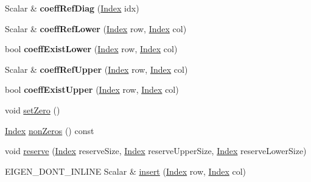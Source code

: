 \begin{DoxyCompactItemize}
Scalar \& {\bfseries coeff\+Ref\+Diag} (\hyperlink{group___core___module_a554f30542cc2316add4b1ea0a492ff02}{Index} idx)
\item 
\mbox{\label{class_eigen_1_1_skyline_matrix_af844129d30a78a6d0ce5d4fac96a0417}} 
Scalar \& {\bfseries coeff\+Ref\+Lower} (\hyperlink{group___core___module_a554f30542cc2316add4b1ea0a492ff02}{Index} row, \hyperlink{group___core___module_a554f30542cc2316add4b1ea0a492ff02}{Index} col)
\item 
\mbox{\label{class_eigen_1_1_skyline_matrix_a30808fc10f3c0e0add1f410013c9937c}} 
bool {\bfseries coeff\+Exist\+Lower} (\hyperlink{group___core___module_a554f30542cc2316add4b1ea0a492ff02}{Index} row, \hyperlink{group___core___module_a554f30542cc2316add4b1ea0a492ff02}{Index} col)
\item 
\mbox{\label{class_eigen_1_1_skyline_matrix_ab7fdd73227a49ea3fde214d36f48dd53}} 
Scalar \& {\bfseries coeff\+Ref\+Upper} (\hyperlink{group___core___module_a554f30542cc2316add4b1ea0a492ff02}{Index} row, \hyperlink{group___core___module_a554f30542cc2316add4b1ea0a492ff02}{Index} col)
\item 
\mbox{\label{class_eigen_1_1_skyline_matrix_aaa87a38402be32756e4d64790c5a9f67}} 
bool {\bfseries coeff\+Exist\+Upper} (\hyperlink{group___core___module_a554f30542cc2316add4b1ea0a492ff02}{Index} row, \hyperlink{group___core___module_a554f30542cc2316add4b1ea0a492ff02}{Index} col)
\item 
void \hyperlink{class_eigen_1_1_skyline_matrix_afeb349e5dc4b5d8c107ff067b44438f5}{set\+Zero} ()
\item 
\hyperlink{group___core___module_a554f30542cc2316add4b1ea0a492ff02}{Index} \hyperlink{class_eigen_1_1_skyline_matrix_aea6d3b694cef560f15a7d18c1f010604}{non\+Zeros} () const
\item 
void \hyperlink{class_eigen_1_1_skyline_matrix_aac6da20a87fca9d4cb6b871504497577}{reserve} (\hyperlink{group___core___module_a554f30542cc2316add4b1ea0a492ff02}{Index} reserve\+Size, \hyperlink{group___core___module_a554f30542cc2316add4b1ea0a492ff02}{Index} reserve\+Upper\+Size, \hyperlink{group___core___module_a554f30542cc2316add4b1ea0a492ff02}{Index} reserve\+Lower\+Size)
\item 
E\+I\+G\+E\+N\+\_\+\+D\+O\+N\+T\+\_\+\+I\+N\+L\+I\+NE Scalar \& \hyperlink{class_eigen_1_1_skyline_matrix_a6e2d550f29d0dd59f83aa9d568d92c23}{insert} (\hyperlink{group___core___module_a554f30542cc2316add4b1ea0a492ff02}{Index} row, \hyperlink{group___core___module_a554f30542cc2316add4b1ea0a492ff02}{Index} col)

\end{DoxyCompactItemize}
